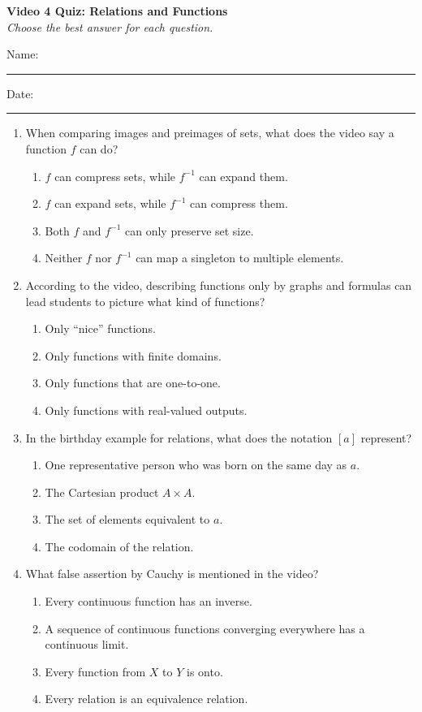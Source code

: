 \documentclass[10pt]{article}
\begin{document}
\begin{center}
  {\large\bfseries Video 4 Quiz: Relations and Functions}\\[0.25em]
  \textit{Choose the best answer for each question.}
\end{center}
\noindent Name:\ \rule{3.2in}{0.4pt}\hfill Date:\ \rule{1.25in}{0.4pt}
\vspace{0.7em}
\begin{enumerate}
  \item When comparing images and preimages of sets, what does the video say a function $f$ can do?
  \begin{enumerate}
    \item $f$ can compress sets, while $f^{-1}$ can expand them.
    \item $f$ can expand sets, while $f^{-1}$ can compress them.
    \item Both $f$ and $f^{-1}$ can only preserve set size.
    \item Neither $f$ nor $f^{-1}$ can map a singleton to multiple elements.
  \end{enumerate}

  \item According to the video, describing functions only by graphs and formulas can lead students to picture what kind of functions?
  \begin{enumerate}
    \item Only ``nice'' functions.
    \item Only functions with finite domains.
    \item Only functions that are one-to-one.
    \item Only functions with real-valued outputs.
  \end{enumerate}

  \item In the birthday example for relations, what does the notation $[a]$ represent?
  \begin{enumerate}
    \item One representative person who was born on the same day as $a$.
    \item The Cartesian product $A\times A$.
    \item The set of elements equivalent to $a$.
    \item The codomain of the relation.
  \end{enumerate}

  \item What false assertion by Cauchy is mentioned in the video?
  \begin{enumerate}
    \item Every continuous function has an inverse.
    \item A sequence of continuous functions converging everywhere has a continuous limit.
    \item Every function from $X$ to $Y$ is onto.
    \item Every relation is an equivalence relation.
  \end{enumerate}
\end{enumerate}
\end{document}
